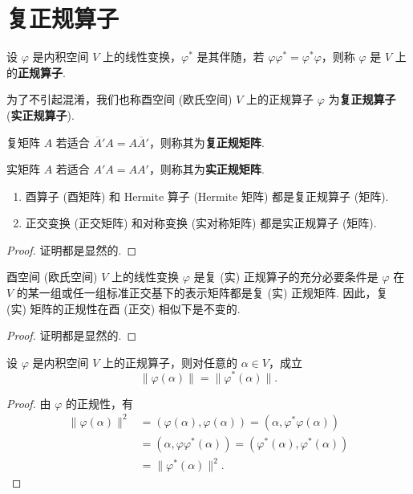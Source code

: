 \documentclass[../../main.tex]{subfiles}
\begin{document}
\section{复正规算子}

\begin{definition}[正规算子和正规矩阵]
设 $\varphi$ 是内积空间 $V$ 上的线性变换，$\varphi^*$ 是其伴随，若 $\varphi\varphi^* = \varphi^*\varphi$，则称 $\varphi$ 是 $V$ 上的\textbf{正规算子}. 

为了不引起混淆，我们也称酉空间 (欧氏空间) $V$ 上的正规算子 $\varphi$ 为\textbf{复正规算子} (\textbf{实正规算子}). 

复矩阵 $A$ 若适合 $\overline{A}'A = A\overline{A}'$，则称其为\textbf{复正规矩阵}. 

实矩阵 $A$ 若适合 $A'A = AA'$，则称其为\textbf{实正规矩阵}.
\end{definition}

\begin{proposition}\label{proposition:常见的正规矩阵}
\begin{enumerate}
\item 酉算子 (酉矩阵) 和 Hermite 算子 (Hermite 矩阵) 都是复正规算子 (矩阵).

\item 正交变换 (正交矩阵) 和对称变换 (实对称矩阵) 都是实正规算子 (矩阵).
\end{enumerate}
\end{proposition}
\begin{proof}
证明都是显然的.

\end{proof}

\begin{theorem}
酉空间 (欧氏空间) $V$ 上的线性变换 $\varphi$ 是复 (实) 正规算子的充分必要条件是 $\varphi$ 在 $V$ 的某一组或任一组标准正交基下的表示矩阵都是复 (实) 正规矩阵. 因此，复 (实) 矩阵的正规性在酉 (正交) 相似下是不变的. 
\end{theorem}
\begin{proof}
证明都是显然的.

\end{proof}

\begin{lemma}\label{lemma:正规算子与伴随的像的范数相同}
设 $\varphi$ 是内积空间 $V$ 上的正规算子，则对任意的 $\alpha \in V$，成立
\[
\|\varphi(\alpha)\| = \|\varphi^*(\alpha)\|.
\]
\end{lemma}
\begin{proof}
由 $\varphi$ 的正规性，有
\begin{align*}
\|\varphi(\alpha)\|^2 &= (\varphi(\alpha),\varphi(\alpha)) = (\alpha,\varphi^*\varphi(\alpha))\\
&= (\alpha,\varphi\varphi^*(\alpha)) = (\varphi^*(\alpha),\varphi^*(\alpha))\\
&= \|\varphi^*(\alpha)\|^2. 
\end{align*}

\end{proof}
\end{document}
